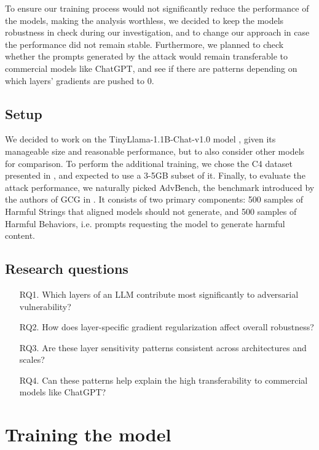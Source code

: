 \documentclass[11pt]{article}
\begin{document}
To ensure our training process would not significantly reduce the performance of the models, making the analysis worthless, we decided to keep the models robustness in check during our investigation, and to change our approach in case the performance did not remain stable. Furthermore, we planned to check whether the prompts generated by the attack would remain transferable to commercial models like ChatGPT, and see if there are patterns depending on which layers' gradients are pushed to 0.

\subsection{Setup}

We decided to work on the TinyLlama-1.1B-Chat-v1.0 model \cite{zhang2024TinyLlama}, given its manageable size and reasonable performance, but to also consider other models for comparison. To perform the additional training, we chose the C4 dataset presented in \cite{dodge-etal-2021-documenting}, and expected to use a 3-5GB subset of it. Finally, to evaluate the attack performance, we naturally picked AdvBench, the benchmark introduced by the authors of GCG in \cite{zou2023universal}. It consists of two primary components: 500 samples of Harmful Strings that aligned models should not generate, and 500 samples of Harmful Behaviors, i.e. prompts requesting the model to generate harmful content.

\subsection{Research questions}

\begin{itemize}
    \item[RQ1.] Which layers of an LLM contribute most significantly to adversarial vulnerability?
    \item[RQ2.] How does layer-specific gradient regularization affect overall robustness?
    \item[RQ3.] Are these layer sensitivity patterns consistent across architectures and scales?
    \item[RQ4.] Can these patterns help explain the high transferability to commercial models like ChatGPT?
\end{itemize}

\section{Training the model}
\label{sec:training}
\end{document}
